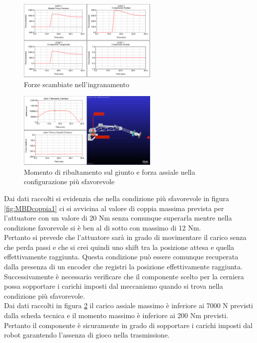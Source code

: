 \documentclass[%
corpo=11pt,
twoside,
 stile=classica,
oldstyle,
greek,%
]{toptesi}
\begin{document}
	\begin{figure} [!ht]
		\centering
		\includegraphics[width=0.6\textwidth]{Plots/BASE/joint1_forze.png}
		\caption{Forze scambiate nell'ingranamento}
		\label{fig:MBDforze1}
	\end{figure}
	\begin{figure}[!ht]
		\centering
		\includegraphics[width=0.6\textwidth]{Plots/BASE/joint1_ralla.png}
		\caption{Momento di ribaltamento sul giunto e forza assiale nella configurazione più sfavorevole}
		\label{fig:MBDralla1}
	\end{figure}
	
			Dai dati raccolti si evidenzia che nella condizione più sfavorevole in figura \ref{fig:MBDcoppia1}  ci si avvicina al valore di coppia massima prevista per l'attuatore con un valore di 20 Nm senza comunque superarla mentre nella condizione favorevole si è ben al di sotto con massimo di 12 Nm. \\
			Pertanto si prevede che l'attuatore sarà in grado di movimentare il carico senza che perda passi e che si crei quindi uno shift tra la posizione attesa e quella effettivamente raggiunta. Questa condizione può essere comunque recuperata dalla presenza di un encoder che registri la posizione effettivamente raggiunta. \\
			
			Successivamente è necessario verificare che il componente scelto per la cerniera possa sopportare i carichi imposti dal meccanismo quando si trova nella condizione più sfavorevole.\\
			Dai dati raccolti in figura \ref{fig:MBDralla1} il carico assiale massimo è inferiore ai 7000 N previsti dalla scheda tecnica e il momento massimo è inferiore ai 200 Nm previsti. Pertanto il componente è sicuramente in grado di sopportare i carichi imposti dal robot garantendo l'assenza di gioco nella trasmissione. \\
			
\end{document}
